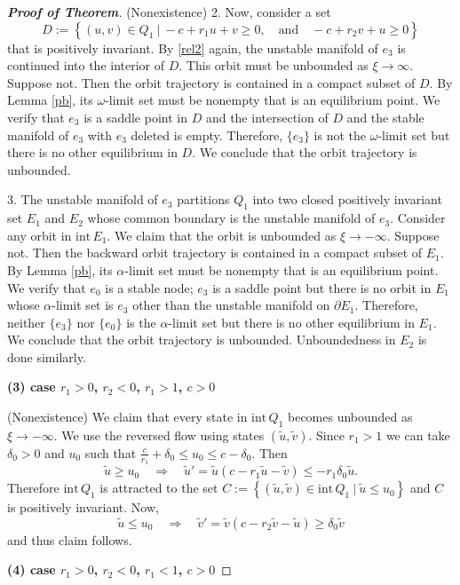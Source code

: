 \documentclass{amsart}
\theoremstyle{definition}
\numberwithin{equation}{section}
\def\ii{{\textrm{int}}\,}
\begin{document}
\begin{proof}[\textbf{Proof of Theorem}]
(Nonexistence) 2. Now, consider a set $$D:= \left\{ (u,v)\in Q_1 ~|~ -c+r_1 u + v \ge 0, \quad \text{and} \quad -c + r_2v +u \ge 0\right\}$$
that is positively invariant. By \eqref{rel2} again, the unstable manifold of $e_3$ is continued into the interior of $D$. This orbit must be unbounded as $\xi \rightarrow \infty.$ Suppose not. Then the orbit trajectory is contained in a compact subset of $D$. By Lemma \ref{pb}, its $\omega$-limit set must be nonempty that is an equilibrium point. We verify that $e_3$ is a saddle point in $D$ and the intersection of $D$ and the stable manifold of $e_3$ with $e_3$ deleted is empty. Therefore, $\{e_3\}$ is not the $\omega$-limit set but there is no other equilibrium in $D$. We conclude that the orbit trajectory is unbounded.

3. The unstable manifold of $e_3$ partitions $Q_1$ into two closed positively invariant set $E_1$ and $E_2$ whose common boundary is the unstable manifold of $e_3$. Consider any orbit in $\ii E_1$. We claim that the orbit is unbounded as $\xi \rightarrow -\infty$. Suppose not. Then the backward orbit trajectory is contained in a compact subset of $E_1$. By Lemma \ref{pb}, its $\alpha$-limit set must be nonempty that is an equilibrium point. We verify that $e_0$ is a stable node; $e_3$ is a saddle point but there is no orbit in $E_1$ whose $\alpha$-limit set is $e_3$ other than the unstable manifold on $\partial E_1$. Therefore, neither $\{e_3\}$ nor $\{e_0\}$ is the $\alpha$-limit set  but there is no other equilibrium in $E_1$. We conclude that the orbit trajectory is unbounded. Unboundedness in $E_2$ is done similarly.
\bigskip


\textbf{(3) \boldmath case $r_1>0$, $r_2<0$, $r_1 >1$, $c>0$}

\bigskip
(Nonexistence) We claim that every state in $\ii Q_1$ becomes unbounded as $\xi \rightarrow -\infty.$ We use the reversed flow using states $(\tilde u, \tilde v)$. Since $r_1>1$ we can take $\delta_0>0$ and $u_0$  such that $\frac{c}{r_1} + \delta_0 \le u_0 \le c-\delta_0$. Then
$$ \tilde u \ge u_0 \quad \Longrightarrow \quad \tilde u' = \tilde u (c-r_1\tilde u -\tilde v) \le -r_1\delta_0 \tilde u.$$
Therefore $\ii Q_1$ is attracted to the set $C:=\left\{(\tilde u , \tilde v) \in \ii Q_1 ~|~ \tilde u\le u_0\right\}$ and $C$ is positively invariant. Now,
$$ \tilde u \le u_0 \quad \Longrightarrow \quad \tilde v' = \tilde v(c-r_2\tilde v - \tilde u) \ge \delta_0 \tilde v$$
and thus claim follows.
\bigskip

\textbf{(4) \boldmath case  $r_1>0$, $r_2<0$, $r_1<1$, $c>0$}


\end{proof}
\end{document}
